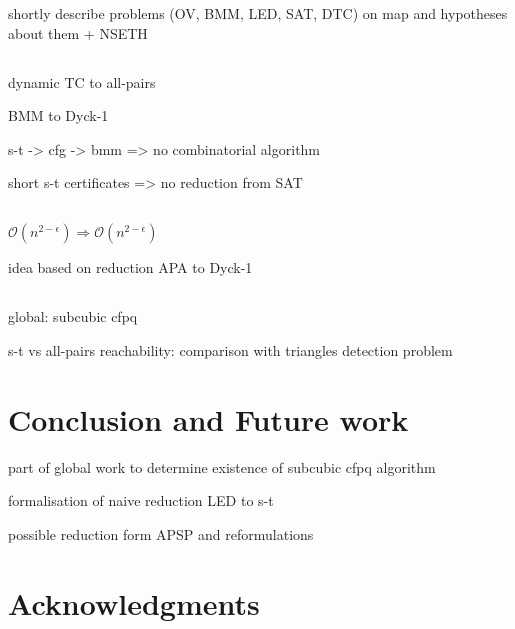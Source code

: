 \documentclass[acmsmall,review,nonacm]{acmart}\settopmatter{printfolios=true,printccs=false,printacmref=false}
\begin{document}
	shortly describe problems (OV, BMM, LED, SAT, DTC) on map and hypotheses about them + NSETH
	
	\subsection{}
	
	dynamic TC to all-pairs
	
	BMM to Dyck-1
	
	s-t -> cfg -> bmm => no combinatorial algorithm
	
	short s-t certificates => no reduction from SAT
	
	\subsection{}
	
	$\mathcal{O}(n^{2 - \epsilon}) \Rightarrow \mathcal{O}(n^{2 - \epsilon})$
	
	idea based on reduction APA to Dyck-1 
		
	\subsection{}
	
	global: subcubic cfpq
	
	s-t vs all-pairs reachability: comparison with triangles detection problem
	
	\section{Conclusion and Future work}
	
	part of global work to determine existence of subcubic cfpq algorithm
	
	formalisation of naive reduction LED to s-t
	
	possible reduction form APSP and reformulations
	
	\section{Acknowledgments}
	
	
	
	
	\appendix
	
\end{document}
